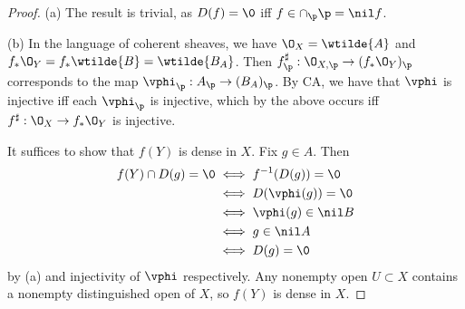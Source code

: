 \documentclass[12pt]{amsart}
\begin{document}
\begin{proof}
  (a) The result is trivial, as $D(f)=\0$ iff $f\in \cap_\p\p=\nil f$.

  (b) In the language of coherent sheaves, we have $\O_X = \wtilde{A}$ and $f_*\O_Y=f_*\wtilde{B} = \wtilde{B_A}$.
  Then $f^\sharp_\p:\O_{X,\p}\to (f_*\O_Y)_\p$ corresponds to the map $\vphi_\p:A_\p\to (B_A)_\p$.
  By CA, we have that $\vphi$ is injective iff each $\vphi_\p$ is injective, which by the above occurs iff $f^\sharp:\O_X\to f_*\O_Y$ is injective.

  It suffices to show that $f(Y)$ is dense in $X$.
  Fix $g\in A$.
  Then
  \begin{align*}
    f(Y)\cap D(g)=\0 &\iff f^{-1}(D(g))=\0 \\
                     &\iff D(\vphi(g))=\0 \\
                     &\iff \vphi(g)\in \nil B \\
                     &\iff g\in \nil A \\
                     &\iff D(g)=\0
  \end{align*}
  by (a) and injectivity of $\vphi$ respectively.
  Any nonempty open $U\subset X$ contains a nonempty distinguished open of $X$, so $f(Y)$ is dense in $X$.
  



\end{proof}
\end{document}
